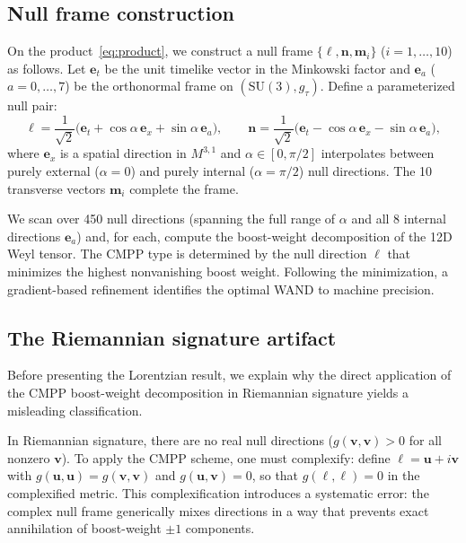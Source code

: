 \documentclass[12pt]{article}
\theoremstyle{definition}
\theoremstyle{remark}
\begin{document}
\subsection{Null frame construction}

On the product~\eqref{eq:product}, we construct a null frame $\{\boldsymbol{\ell},\boldsymbol{n},\boldsymbol{m}_i\}$ ($i=1,\ldots,10$) as follows.  Let $\boldsymbol{e}_t$ be the unit timelike vector in the Minkowski factor and $\boldsymbol{e}_a$ ($a=0,\ldots,7$) be the orthonormal frame on $(\mathrm{SU}(3),g_\tau)$.  Define a parameterized null pair:
\begin{equation}
\boldsymbol{\ell} = \frac{1}{\sqrt{2}}\bigl(\boldsymbol{e}_t + \cos\alpha\,\boldsymbol{e}_x + \sin\alpha\,\boldsymbol{e}_a\bigr), \qquad
\boldsymbol{n} = \frac{1}{\sqrt{2}}\bigl(\boldsymbol{e}_t - \cos\alpha\,\boldsymbol{e}_x - \sin\alpha\,\boldsymbol{e}_a\bigr),
\end{equation}
where $\boldsymbol{e}_x$ is a spatial direction in $M^{3,1}$ and $\alpha\in[0,\pi/2]$ interpolates between purely external ($\alpha=0$) and purely internal ($\alpha=\pi/2$) null directions.  The 10 transverse vectors $\boldsymbol{m}_i$ complete the frame.

We scan over 450 null directions (spanning the full range of $\alpha$ and all 8 internal directions $\boldsymbol{e}_a$) and, for each, compute the boost-weight decomposition of the 12D Weyl tensor.  The CMPP type is determined by the null direction $\boldsymbol{\ell}$ that minimizes the highest nonvanishing boost weight.  Following the minimization, a gradient-based refinement identifies the optimal WAND to machine precision.

\subsection{The Riemannian signature artifact}

Before presenting the Lorentzian result, we explain why the direct application of the CMPP boost-weight decomposition in Riemannian signature yields a misleading classification.

In Riemannian signature, there are no real null directions ($g(\boldsymbol{v},\boldsymbol{v})>0$ for all nonzero $\boldsymbol{v}$).  To apply the CMPP scheme, one must complexify: define $\boldsymbol{\ell}=\boldsymbol{u}+i\boldsymbol{v}$ with $g(\boldsymbol{u},\boldsymbol{u})=g(\boldsymbol{v},\boldsymbol{v})$ and $g(\boldsymbol{u},\boldsymbol{v})=0$, so that $g(\boldsymbol{\ell},\boldsymbol{\ell})=0$ in the complexified metric.  This complexification introduces a systematic error: the complex null frame generically mixes directions in a way that prevents exact annihilation of boost-weight $\pm1$ components.
\end{document}

